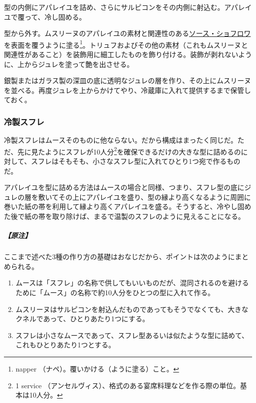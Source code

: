 \begin{recette}
型の内側にアパレイユを詰め、さらにサルピコンをその内側に射込む。アパレイユで覆って、冷し固める。

型から外す。ムスリーヌのアパレイユの素材と関連性のある\protect\hyperlink{sauce-chaud-froid-ordinaire}{ソース・ショフロワ}を表面を覆うように塗る\footnote{napper
  （ナペ）。覆いかける（ように塗る）こと。}。トリュフおよびその他の素材（これもムスリーヌと関連性があること）を装飾用に細工したものを飾り付ける。装飾が剥れないように、上からジュレを塗って艶を出させる。

銀製またはガラス製の深皿の底に透明なジュレの層を作り、その上にムスリーヌを並べる。再度ジュレを上からかけてやり、冷蔵庫に入れて提供するまで保管しておく。

\hypertarget{souffles-froids}{%
\subsubsection{冷製スフレ}\label{souffles-froids}}



冷製スフレはムースそのものに他ならない。だから構成はまったく同じだ。ただ、先に見たようにスフレが10人分\footnote{1
  service
  （アンセルヴィス）、格式のある宴席料理などを作る際の単位。基本は10人分。}を確保できるだけの大きな型に詰めるのに対して、スフレはそもそも、小さなスフレ型に入れてひとり1つ宛で作るものだ。

アパレイユを型に詰める方法はムースの場合と同様、つまり、スフレ型の底にジュレの層を敷いてその上にアパレイユを盛り、型の縁より高くなるように周囲に巻いた紙の帯を利用して縁より高くアパレイユを盛る。そうすると、冷やし固めた後で紙の帯を取り除けば、まるで温製のスフレのように見えることになる。

\hypertarget{nota-souffles-froids}{%
\subparagraph{【原注】}\label{nota-souffles-froids}}

ここまで述べた3種の作り方の基礎はおなじだから、ポイントは次のようにまとめられる。

\begin{enumerate}
\def\labelenumi{\arabic{enumi}.}
\item
  ムースは「スフレ」の名称で供してもいいものだが、混同されるのを避けるために「ムース」の名称で約10人分をひとつの型に入れて作る。
\item
  ムスリーヌはサルピコンを射込んだものであってもそうでなくても、大きなクネルであって、ひとりあたり1つにする。
\item
  スフレは小さなムースであって、スフレ型あるいは似たような型に詰めて、これもひとりあたり1つとする。
\end{enumerate}
\end{recette}
